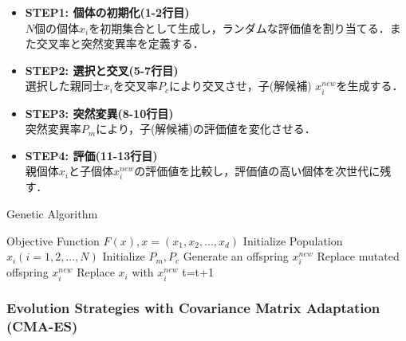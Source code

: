 \documentclass[a4j,11pt]{jarticle}
\begin{document}
\begin{itemize}
\item {\bf STEP1: 個体の初期化(1-2行目)} \\
$N$個の個体$x_i$を初期集合として生成し，ランダムな評価値を割り当てる．また交叉率と突然変異率を定義する．
\item {\bf STEP2: 選択と交叉(5-7行目)} \\
選択した親同士$x_i$を交叉率$P_c$により交叉させ，子(解候補) $x_i^{new}$を生成する．
\item {\bf STEP3: 突然変異(8-10行目)} \\
突然変異率$P_m$により，子(解候補)の評価値を変化させる．
\item {\bf STEP4: 評価(11-13行目)} \\
親個体$x_i$と子個体$x_i^{new}$の評価値を比較し，評価値の高い個体を次世代に残す．
\end{itemize}

\renewcommand{\algorithmicrequire}{\textbf{Input:}}
\renewcommand{\algorithmicensure}{\textbf{Output:}}

\begin{algorithm}[H]
\caption{Genetic Algorithm}
\label{code:ga}
\begin{algorithmic}[1]
\REQUIRE Objective Function $F(x), x=(x_1,x_2,...,x_d)$
\STATE Initialize Population $x_i (i=1,2,...,N)$
\STATE Initialize $P_m, P_c$
\STATE Generate an offspring $x_i^{new}$ 
\ENDIF
{}
\STATE Replace mutated offspring $x_i^{new}$
\ENDIF
{}
\STATE Replace $x_i$ with $x_i^{new}$
\ENDIF
\ENDFOR
\STATE t=t+1
\ENDWHILE
\end{algorithmic}
\end{algorithm}


\subsubsection{Evolution Strategies with Covariance Matrix Adaptation (CMA-ES)}
\label{sss:cma-es}
\end{document}
